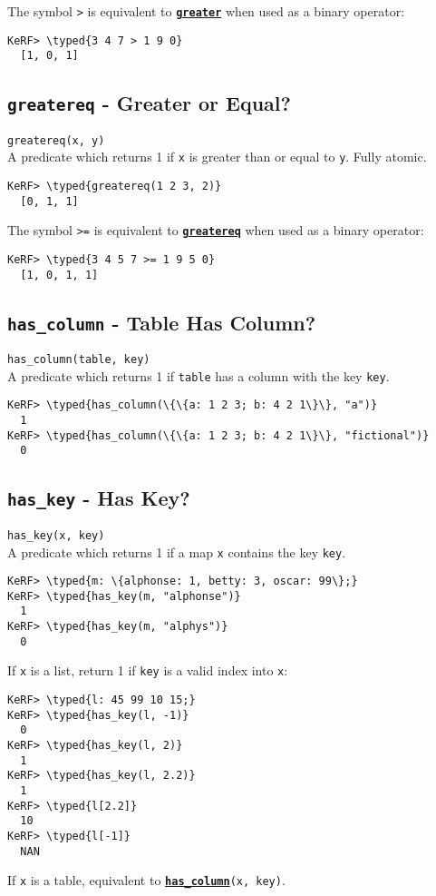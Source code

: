 \documentclass{article}
\newcommand{\typed}[1]{\textcolor{TealBlue}{#1}}
\newcommand{\primdefu}[3]{\subsection{\texttt{#1} - #2}\label{prim:#3}}
\newcommand{\primu}[2]{\hyperref[prim:#2]{\textbf{\texttt{#1}}}}
\newcommand{\primdef}[2]{\primdefu{#1}{#2}{#1}}
\newcommand{\prim}[1]{\primu{#1}{#1}}
\begin{document}
The symbol \texttt{>} is equivalent to \prim{greater} when used as a binary operator:
\begin{Verbatim}
KeRF> \typed{3 4 7 > 1 9 0}
  [1, 0, 1]
\end{Verbatim}

\primdef{greatereq}{Greater or Equal?}
\texttt{greatereq(x, y)}\\

A predicate which returns 1 if \texttt{x} is greater than or equal to \texttt{y}. Fully atomic.
\begin{Verbatim}
KeRF> \typed{greatereq(1 2 3, 2)}
  [0, 1, 1]
\end{Verbatim}

The symbol \texttt{>=} is equivalent to \prim{greatereq} when used as a binary operator:
\begin{Verbatim}
KeRF> \typed{3 4 5 7 >= 1 9 5 0}
  [1, 0, 1, 1]
\end{Verbatim}

\primdefu{has\_column}{Table Has Column?}{hasColumn}
\texttt{has\_column(table, key)}\\

A predicate which returns 1 if \texttt{table} has a column with the key \texttt{key}.
\begin{Verbatim}
KeRF> \typed{has_column(\{\{a: 1 2 3; b: 4 2 1\}\}, "a")}
  1
KeRF> \typed{has_column(\{\{a: 1 2 3; b: 4 2 1\}\}, "fictional")}
  0
\end{Verbatim}

\pagebreak
\primdefu{has\_key}{Has Key?}{hasKey}
\texttt{has\_key(x, key)}\\

A predicate which returns 1 if a map \texttt{x} contains the key \texttt{key}.
\begin{Verbatim}
KeRF> \typed{m: \{alphonse: 1, betty: 3, oscar: 99\};}
KeRF> \typed{has_key(m, "alphonse")}
  1
KeRF> \typed{has_key(m, "alphys")}
  0
\end{Verbatim}

If \texttt{x} is a list, return 1 if \texttt{key} is a valid index into \texttt{x}:
\begin{Verbatim}
KeRF> \typed{l: 45 99 10 15;}
KeRF> \typed{has_key(l, -1)}
  0
KeRF> \typed{has_key(l, 2)}
  1
KeRF> \typed{has_key(l, 2.2)}
  1
KeRF> \typed{l[2.2]}
  10
KeRF> \typed{l[-1]}
  NAN
\end{Verbatim}

If \texttt{x} is a table, equivalent to \primu{has\_column}{hasColumn}\texttt{(x, key)}.
\end{document}
